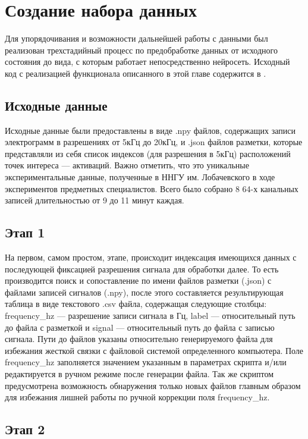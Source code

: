 \chapter{Создание набора данных}

Для упорядочивания и возможности дальнейшей работы с данными был реализован
трехстадийный процесс по предобработке данных от исходного состояния до вида, с
которым работает непосредственно нейросеть. Исходный код с реализацией
функционала описанного в этой главе содержится в \cite{egm-dataset-source}.


\section{Исходные данные}

Исходные данные были предоставлены в виде .npy файлов, содержащих записи
электрограмм в разрешениях от 5кГц до 20кГц, и .json файлов разметки, которые
представляли из себя список индексов (для разрешения в 5кГц) расположений точек
интереса --- активаций. Важно отметить, что это уникальные экспериментальные
данные, полученные в ННГУ им. Лобачевского в ходе экспериментов предметных
специалистов. Всего было собрано 8 64-х канальных записей длительностью от 9 до
11 минут каждая.

\section{Этап 1}

На первом, самом простом, этапе, происходит индексация имеющихся данных с
последующей фиксацией разрешения сигнала для обработки далее. То есть
производится поиск и сопоставление по имени файлов разметки (.json) с файлами
записей сигналов (.npy), после этого составляется результирующая таблица в виде
текстового .csv файла, содержащая следующие столбцы: frequency\_hz ---
разрешение записи сигнала в Гц, label --- относительный путь до файла с
разметкой и signal --- относительный путь до файла с записью сигнала. Пути до
файлов указаны относительно генерируемого файла для избежания жесткой связки с
файловой системой определенного компьютера. Поле frequency\_hz заполняется
значением указанным в параметрах скрипта и/или редактируется в ручном режиме
после генерации файла. Так же скриптом предусмотрена возможность обнаружения
только новых файлов главным образом для избежания лишней работы по ручной
коррекции поля frequency\_hz.

\section{Этап 2}

